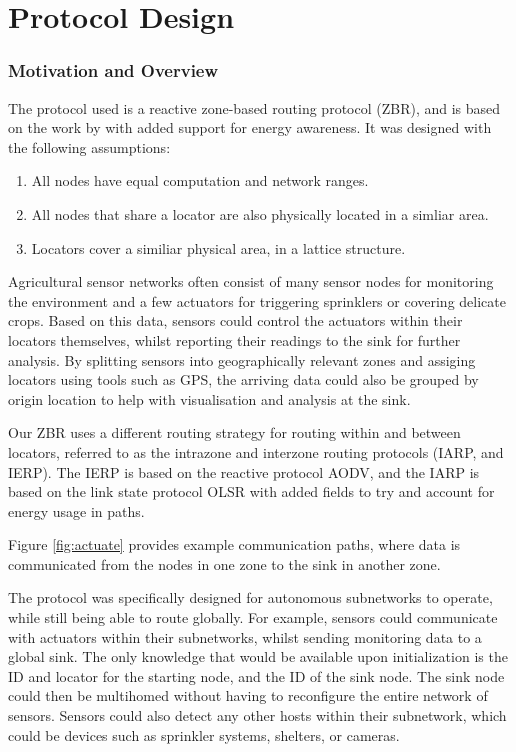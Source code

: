 \documentclass[12pt]{article}
\begin{document}
\pagebreak
\part{Protocol Design} \label{protodesign}

\section{Motivation and Overview}

The protocol used is a reactive zone-based routing protocol (ZBR), and is based on the work by \cite{zbrp} with added support for energy awareness. It was designed with the following assumptions:

\begin{enumerate}
	\item All nodes have equal computation and network ranges.
	\item All nodes that share a locator are also physically located in a simliar area.
	\item Locators cover a similiar physical area, in a lattice structure.
\end{enumerate}

Agricultural sensor networks often consist of many sensor nodes for monitoring the environment and a few actuators for triggering sprinklers or covering delicate crops. Based on this data, sensors could control the actuators within their locators themselves, whilst reporting their readings to the sink for further analysis. By splitting sensors into geographically relevant zones and assiging locators using tools such as GPS, the arriving data could also be grouped by origin location to help with visualisation and analysis at the sink. 

Our ZBR uses a different routing strategy for routing within and between locators, referred to as the intrazone and interzone routing protocols (IARP, and IERP). The IERP is based on the reactive protocol AODV, and the IARP is based on the link state protocol OLSR with added fields to try and account for energy usage in paths. 

Figure \ref{fig:actuate} provides example communication paths, where data is communicated from the nodes in one zone to the sink in another zone.

The protocol was specifically designed for autonomous subnetworks to operate, while still being able to route globally. For example, sensors could communicate with actuators within their subnetworks, whilst sending monitoring data to a global sink. The only knowledge that would be available upon initialization is the ID and locator for the starting node, and the ID of the sink node. The sink node could then be multihomed without having to reconfigure the entire network of sensors. Sensors could also detect any other hosts within their subnetwork, which could be devices such as sprinkler systems, shelters, or cameras.
\end{document}
